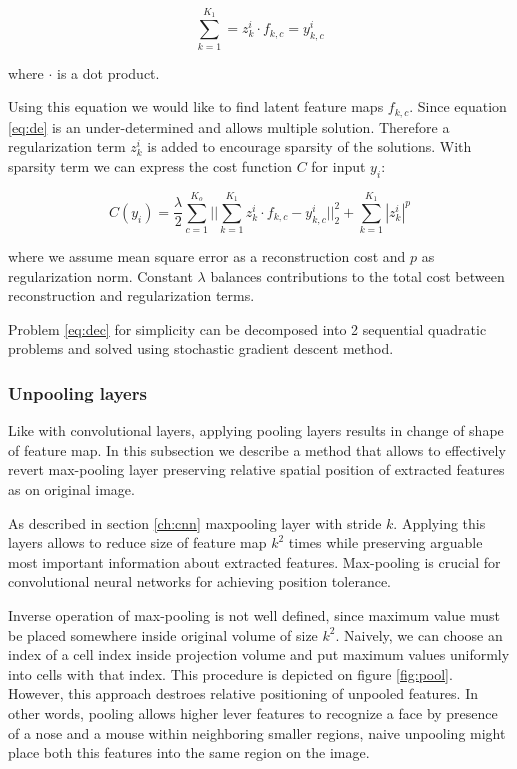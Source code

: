 \begin{equation}\label{eq:de}
  \sum^{K_1}_{k=1}=z^i_k \cdot f_{k,c} = y^i_{k,c}
\end{equation}

where $\cdot$ is a dot product.

Using this equation we would like to find latent feature maps $f_{k,c}$.
Since equation \ref{eq:de} is an under-determined and allows multiple solution.
Therefore a regularization term $z^i_k$ is added to encourage sparsity of the solutions.
With sparsity term we can express the cost function $C$ for input $y_i$:

\begin{equation}\label{eq:dec}
    C(y_i) = \frac{\lambda}{2} \sum^{K_o}_{c=1} ||\sum^{K_1}_{k=1}{z^i_k \cdot f_{k,c} - y^i_{k,c}}||^2_2 + \sum^{K_1}_{k=1}{|z^i_k|^p}
\end{equation}

where we assume mean square error as a reconstruction cost and $p$ as regularization norm.
Constant $\lambda$ balances contributions to the total cost between reconstruction and regularization terms.

Problem \ref{eq:dec} for simplicity can be decomposed into 2 sequential quadratic problems and solved using stochastic gradient descent method.

\subsubsection{Unpooling layers}

Like with convolutional layers, applying pooling layers results in change of shape of feature map.
In this subsection we describe a method that allows to effectively revert max-pooling layer preserving relative spatial position of extracted features as on original image.

As described in section \ref{ch:cnn} maxpooling layer with stride $k$.
Applying this layers allows to reduce size of feature map $k^2$ times while preserving arguable most important information about extracted features.
Max-pooling is crucial for convolutional neural networks for achieving position tolerance.

Inverse operation of max-pooling is not well defined, since maximum value must be placed somewhere inside original volume of size $k^2$. Naively, we can choose an index of a cell index inside projection volume and put maximum values uniformly into cells with that index.
This procedure is depicted on figure \ref{fig:pool}.
However, this approach destroes relative positioning of unpooled features.
In other words, pooling allows higher lever features to recognize a face by presence of a nose and a mouse within neighboring smaller regions, naive unpooling might place both this features into the same region on the image.

